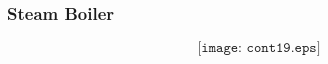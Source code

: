\documentclass{beamer}
\begin{document}
\begin{frame}
	\frametitle{Steam Boiler}

$$\texttt{[image: cont19.eps]}$$

\end{frame}





\end{document}
